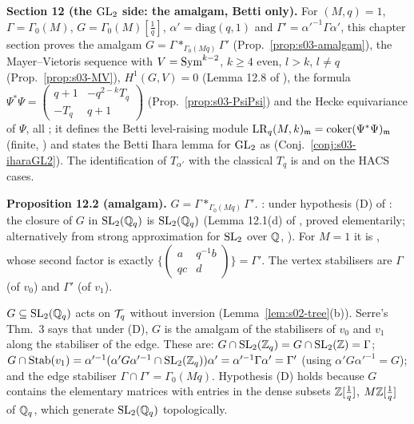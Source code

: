 \medskip
\noindent{}\label{rpt:ss:s03-amalgam}\textbf{Section 12 (the $\mathrm{GL}_2$ side: the amalgam, Betti only).}
For $(M,q)=1$, $\Gamma=\Gamma_0(M)$, $G=\Gamma_0(M)[\frac1q]$, $\alpha'=\mathrm{diag}(q,1)$ and $\Gamma'=\alpha'^{-1}\Gamma\alpha'$, this chapter
section proves the amalgam $G=\Gamma*_{\Gamma_0(Mq)}\Gamma'$ (Prop.~\ref{prop:s03-amalgam}), the Mayer--Vietoris sequence with
$V=\mathrm{Sym}^{k-2}$, $k\ge4$ even, $l>k$, $l\ne q$ (Prop.~\ref{prop:s03-MV}), $H^1(G,V)=0$ (Lemma 12.8 of \mainpdf), the formula
$\Psi^*\Psi=\left(\begin{smallmatrix}q+1&-q^{2-k}T_q\\-T_q&q+1\end{smallmatrix}\right)$ (Prop.~\ref{prop:s03-PsiPsi}) and the Hecke
equivariance of $\Psi$, all \stpmc; it defines the Betti level-raising module $\mathrm{LR}_q(M,k)_{\mathfrak{m}}=\operatorname{coker}(\Psi^*\Psi)_{\mathfrak{m}}$ (finite, \stproved)
and states the Betti Ihara lemma for $\mathrm{GL}_2$ as \stexp{} (Conj.~\ref{conj:s03-iharaGL2}). The identification of $T_{\alpha'}$ with the
classical $T_q$ is \stpmc{} and \stcomp{} on the HACS cases.

\medskip
\noindent{}\label{rpt:prop:s03-amalgam}\textbf{Proposition 12.2 (amalgam).}
\emph{$G=\Gamma*_{\Gamma_0(Mq)}\Gamma'$.} \stpmc: \cite[II.1.4, Thm.~3, p.~79]{Se} under hypothesis (D) of \cite[II.1.4, Thm.~2, p.~78]{Se}:
the closure of $G$ in $\mathrm{SL}_2(\mathbb{Q}_q)$ is $\mathrm{SL}_2(\mathbb{Q}_q)$ (Lemma 12.1(d) of \mainpdf, proved elementarily; alternatively from strong approximation
for $\mathrm{SL}_2$ over $\mathbb{Q}$, \cite[Thm.~28.2.3, p.~480]{Vo}). For $M=1$ it is \cite[II.1.4, Cor.~2, p.~80; p.~81]{Se} \stcited, whose second
factor is exactly $\{(\begin{smallmatrix}a&q^{-1}b\\qc&d\end{smallmatrix})\}=\Gamma'$. The vertex stabilisers are $\Gamma$ (of $v_0$) and
$\Gamma'$ (of $v_1$).
\begin{outline}
$G\subseteq\mathrm{SL}_2(\mathbb{Q}_q)$ acts on $\mathcal{T}_q$ without inversion (Lemma~\ref{lem:s02-tree}(b)). Serre's Thm.~3 says that under (D), $G$ is the amalgam
of the stabilisers of $v_0$ and $v_1$ along the stabiliser of the edge. These are: $G\cap\mathrm{SL}_2(\mathbb{Z}_q)=G\cap\mathrm{SL}_2(\mathbb{Z})=\Gamma$;
$G\cap\operatorname{Stab}(v_1)=\alpha'^{-1}(\alpha'G\alpha'^{-1}\cap\mathrm{SL}_2(\mathbb{Z}_q))\alpha'=\alpha'^{-1}\Gamma\alpha'=\Gamma'$ (using $\alpha'G\alpha'^{-1}=G$);
and the edge stabiliser $\Gamma\cap\Gamma'=\Gamma_0(Mq)$. Hypothesis (D) holds because $G$ contains the elementary matrices with entries in
the dense subsets $\mathbb{Z}[\frac1q]$, $M\mathbb{Z}[\frac1q]$ of $\mathbb{Q}_q$, which generate $\mathrm{SL}_2(\mathbb{Q}_q)$ topologically.
\end{outline}

